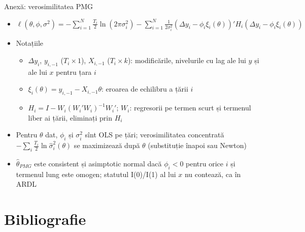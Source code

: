 \begin{frame}{Anexă: verosimilitatea PMG}
\hypertarget{atsapp3}{}
\itemsize{\small}
\begin{itemize}
    \item $\ell(\theta, \phi, \sigma^2) = -\sum_{i=1}^N\frac{T_i}{2}\ln(2\pi\sigma_i^2) - \sum_{i=1}^N\frac{1}{2\sigma_i^2}(\Delta y_i - \phi_i\xi_i(\theta))'H_i(\Delta y_i - \phi_i\xi_i(\theta))$
    \item Notațiile
    \begin{itemize}
        \item $\Delta y_i$, $y_{i,-1}$ ($T_i\times 1$), $X_{i,-1}$ ($T_i\times k$): modificările, nivelurile cu lag ale lui $y$ și ale lui $x$ pentru țara $i$
        \item $\xi_i(\theta) = y_{i,-1} - X_{i,-1}\theta$: eroarea de echilibru a țării $i$
        \item $H_i = I - W_i(W_i'W_i)^{-1}W_i'$; $W_i$: regresorii pe termen scurt și termenul liber ai țării, eliminați prin $H_i$
    \end{itemize}
    \item Pentru $\theta$ dat, $\phi_i$ și $\sigma_i^2$ sînt OLS pe țări; verosimilitatea concentrată $-\sum_i\frac{T_i}{2}\ln\hat\sigma_i^2(\theta)$ se maximizează după $\theta$ (substituție înapoi sau Newton)
    \item $\hat\theta_{PMG}$ este consistent și asimptotic normal dacă $\phi_i < 0$ pentru orice $i$ și termenul lung este omogen; statutul I(0)/I(1) al lui $x$ nu contează, ca în ARDL
\end{itemize}
\end{frame}


\section{Bibliografie}

